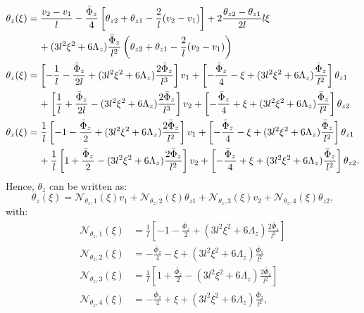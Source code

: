 \documentclass[a4paper,11pt]{article}
\begin{document}
\begin{align}
	\theta_z(\xi) & = \frac{v_2 - v_1}{l} - \frac{\bar{\Phi}_z}{4} \left[ \theta_{z2} + \theta_{z1} -\frac{2}{l}(v_2-v_1) \right] + 2\frac{\theta_{z2} - \theta_{z1}}{2l} l\xi \nonumber \\
	 & \text{\hspace{4mm}} + (3l^2\xi^2 + 6\Lambda_z) \frac{\bar{\Phi}_z}{l^2} \left( \theta_{z2} + \theta_{z1} -\frac{2}{l}(v_2-v_1) \right) \nonumber \\
	 \theta_z(\xi) & = \left[ -\frac{1}{l} -\frac{\bar{\Phi}_z}{2l} + (3l^2\xi^2 + 6\Lambda_z) \frac{2\bar{\Phi}_z}{l^3} \right] v_1 + \left[ -\frac{\bar{\Phi}_z}{4} - \xi + (3l^2\xi^2 + 6\Lambda_z) \frac{\bar{\Phi}_z}{l^2} \right]  \theta_{z1} \nonumber \\
	 & \text{\hspace{4mm}} + \left[ \frac{1}{l} + \frac{\bar{\Phi}_z}{2l} - (3l^2\xi^2 + 6\Lambda_z) \frac{2\bar{\Phi}_z}{l^3} \right] v_2 + \left[ -\frac{\bar{\Phi}_z}{4} + \xi + (3l^2\xi^2 + 6\Lambda_z) \frac{\bar{\Phi}_z}{l^2} \right] \theta_{z2} \nonumber \\
	 \theta_z(\xi) & =  \frac{1}{l} \left[ -1 - \frac{\bar{\Phi}_z}{2} + (3l^2\xi^2 + 6\Lambda_z) \frac{2\bar{\Phi}_z}{l^2} \right] v_1 + \left[ -\frac{\bar{\Phi}_z}{4} - \xi + (3l^2\xi^2 + 6\Lambda_z) \frac{\bar{\Phi}_z}{l^2} \right]  \theta_{z1} \nonumber \\
	 & \text{\hspace{4mm}} + \frac{1}{l} \left[ 1 + \frac{\bar{\Phi}_z}{2} - (3l^2\xi^2 + 6\Lambda_z) \frac{2\bar{\Phi}_z}{l^2} \right] v_2 + \left[ -\frac{\bar{\Phi}_z}{4} + \xi + (3l^2\xi^2 + 6\Lambda_z) \frac{\bar{\Phi}_z}{l^2} \right] \theta_{z2}.
\end{align}
Hence, $\theta_z$ can be written as:
\begin{equation} \label{eq:theta_z_expr_final}
	\theta_z(\xi) = \mathcal{N}_{\theta_z,1}(\xi)v_1 + \mathcal{N}_{\theta_z,2}(\xi)\theta_{z1} + \mathcal{N}_{\theta_z,3}(\xi)v_2 + \mathcal{N}_{\theta_z,4}(\xi)\theta_{z2},
\end{equation}
with:
\begin{equation}
\begin{aligned}
	\mathcal{N}_{\theta_z,1}(\xi) & = \frac{1}{l} \left[ -1 - \frac{\bar{\Phi}_z}{2} + (3l^2\xi^2 + 6\Lambda_z) \frac{2\bar{\Phi}_z}{l^2} \right] \\
	\mathcal{N}_{\theta_z,2}(\xi) & = -\frac{\bar{\Phi}_z}{4} - \xi + (3l^2\xi^2 + 6\Lambda_z) \frac{\bar{\Phi}_z}{l^2} \\
	\mathcal{N}_{\theta_z,3}(\xi) & = \frac{1}{l} \left[ 1 + \frac{\bar{\Phi}_z}{2} - (3l^2\xi^2 + 6\Lambda_z) \frac{2\bar{\Phi}_z}{l^2} \right] \\
	\mathcal{N}_{\theta_z,4}(\xi) & = -\frac{\bar{\Phi}_z}{4} + \xi + (3l^2\xi^2 + 6\Lambda_z) \frac{\bar{\Phi}_z}{l^2},
\end{aligned}
\end{equation}
\end{document}
